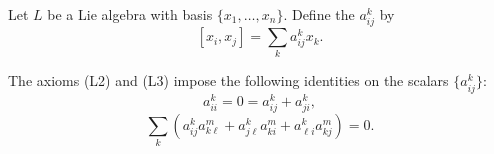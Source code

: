 Let $L$ be a Lie algebra with basis $\{x_1, \ldots, x_n\}$. Define the  $a_{ij}^k$ by
$$[x_i, x_j] = \sum_k a_{ij}^k x_k.$$

The axioms (L2) and (L3) impose the following identities on the scalars $\{a_{ij}^k\}$:
$$a_{ii}^k = 0 = a_{ij}^k + a_{ji}^k,$$
$$\sum_k (a_{ij}^k a_{k\ell}^m + a_{j\ell}^k a_{ki}^m + a_{\ell i}^k a_{kj}^m) = 0.$$
